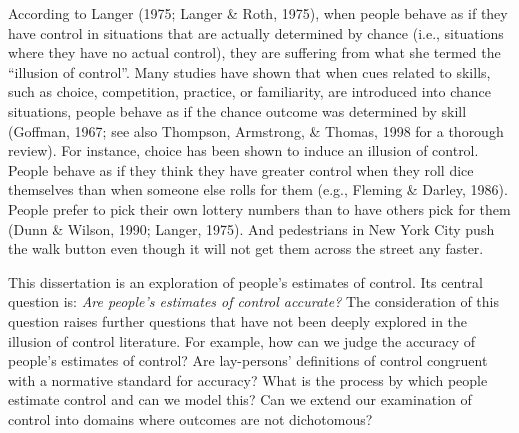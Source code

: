 \documentclass[USenglish,letterpaper,12pt,extrafontsizes,oneside,onecolumn,final]{memoir}
\begin{document}
According to Langer (1975; Langer \& Roth, 1975), when people behave as if they have control in situations that are actually determined by chance (i.e., situations where they have no actual control), they are suffering from what she termed the ``illusion of control''. Many studies have shown that when cues related to skills, such as choice, competition, practice, or familiarity, are introduced into chance situations, people behave as if the chance outcome was determined by skill (Goffman, 1967; see also Thompson, Armstrong, \& Thomas, 1998 for a thorough review). For instance, choice has been shown to induce an illusion of control. People behave as if they think they have greater control when they roll dice themselves than when someone else rolls for them (e.g., Fleming \& Darley, 1986). People prefer to pick their own lottery numbers than to have others pick for them (Dunn \& Wilson, 1990; Langer, 1975). And pedestrians in New York City push the walk button even though it will not get them across the street any faster.

This dissertation is an exploration of people's estimates of control. Its central question is: \emph{Are people's estimates of control accurate?} The consideration of this question raises further questions that have not been deeply explored in the illusion of control literature.  For example, how can we judge the accuracy of people's estimates of control?  Are lay-persons' definitions of control congruent with a normative standard for accuracy?  
What is the process by which people estimate control and can we model this?  Can we extend our examination of control into domains where outcomes are not dichotomous?
\end{document}
